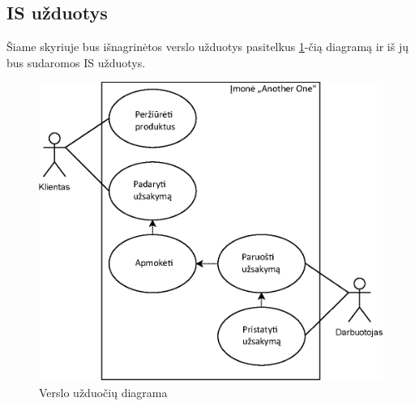 \documentclass{VUMIFPSkursinis}
\begin{document}
\subsection{IS užduotys}
Šiame skyriuje bus išnagrinėtos verslo užduotys pasitelkus \ref{img:UC}-čią diagramą ir iš jų bus sudaromos IS užduotys.
\begin{figure}[H]
    \centering
    \includegraphics[scale=1]{img/UseCase}
    \caption{Verslo užduočių diagrama}
    \label{img:UC}
\end{figure}
\end{document}
